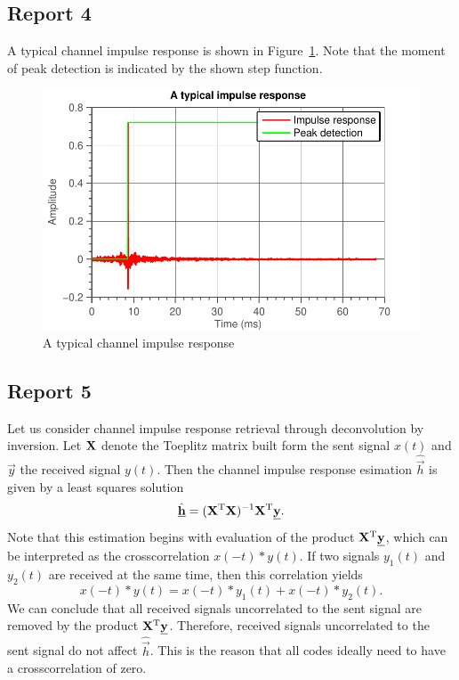 \documentclass[11pt,titlepage]{report}
\begin{document}
\subsection{Report 4}
A typical channel impulse response is shown in Figure~\ref{fig:ass-2-rep-4}. Note that the moment of peak detection is indicated by the shown step function.

\begin{figure}[H]
	\begin{center}
		\includegraphics[width=.6\linewidth]{../../deliverable-7-resources/figures/ass-2/report-4-5/ass-2-report-4.pdf}
	\end{center}
	\caption{A typical channel impulse response}
	\label{fig:ass-2-rep-4}
\end{figure}

\subsection{Report 5}
\label{subsec:ass-2-rep-5}
Let us consider channel impulse response retrieval through deconvolution by inversion. Let $\mathbf{X}$ denote the Toeplitz matrix built form the sent signal $x(t)$ and $\vec{y}$ the received signal $y(t)$. Then the channel impulse response esimation $\hat{\vec{h}}$ is given by a least squares solution
\[
	\hat{\mathbf{\underline{h}}} = (\mathbf{X}^{\text T} \mathbf{X})^{-1} \mathbf{X}^{\text T} \mathbf{\underline{y}}.
\]
Note that this estimation begins with evaluation of the product $\mathbf{X}^{\text T} \mathbf{\underline{y}}$, which can be interpreted as the crosscorrelation $x(-t) \ast y(t)$. If two signals $y_1(t)$ and $y_2(t)$ are received at the same time, then this correlation yields
\[
	x(-t) \ast y(t) = x(-t) \ast y_1(t) + x(-t) \ast y_2(t).
\]
We can conclude that all received signals uncorrelated to the sent signal are removed by the product $\mathbf{X}^{\text T} \mathbf{\underline{y}}$. Therefore, received signals uncorrelated to the sent signal do not affect $\hat{\vec{h}}$. This is the reason that all codes ideally need to have a crosscorrelation of zero.
\end{document}
